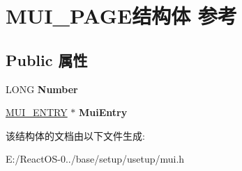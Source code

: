 \hypertarget{struct_m_u_i___p_a_g_e}{}\section{M\+U\+I\+\_\+\+P\+A\+G\+E结构体 参考}
\label{struct_m_u_i___p_a_g_e}
\subsection*{Public 属性}
\begin{DoxyCompactItemize}
\item 
\mbox{\label{struct_m_u_i___p_a_g_e_a5da480869377b9e60ca11daf816cac7e}} 
L\+O\+NG {\bfseries Number}
\item 
\mbox{\label{struct_m_u_i___p_a_g_e_ae63123e1167060e1a1481f03b97bdffa}} 
\hyperlink{struct_m_u_i___e_n_t_r_y}{M\+U\+I\+\_\+\+E\+N\+T\+RY} $\ast$ {\bfseries Mui\+Entry}
\end{DoxyCompactItemize}


该结构体的文档由以下文件生成\+:\begin{DoxyCompactItemize}
\item 
E\+:/\+React\+O\+S-\/0../base/setup/usetup/mui.\+h\end{DoxyCompactItemize}
